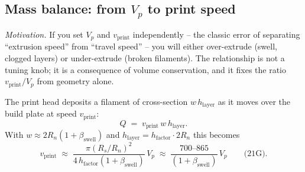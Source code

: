 \documentclass[11pt,a4paper]{article}
\begin{document}
\subsection{Mass balance: from $V_p$ to print speed}
\label{sec:mass_balance_vprint}

\emph{Motivation.}
If you set $V_p$ and $v_\mathrm{print}$ independently -- the classic
error of separating ``extrusion speed'' from ``travel speed'' -- you
will either over-extrude (swell, clogged layers) or under-extrude (broken
filaments). The relationship is not a tuning knob; it is a consequence of
volume conservation, and it fixes the ratio $v_\mathrm{print}/V_p$ from
geometry alone.

The print head deposits a filament of cross-section $w\,h_\mathrm{layer}$
as it moves over the build plate at speed $v_\mathrm{print}$:
\begin{equation}
Q \;=\; v_\mathrm{print}\, w\, h_\mathrm{layer}.
\label{eq:vprint}
\end{equation}
With $w\approx 2R_n(1+\beta_\mathrm{swell})$ and
$h_\mathrm{layer}=h_\mathrm{factor}\cdot 2R_n$ this becomes
\begin{equation}
v_\mathrm{print}
\;\approx\;
\frac{\pi(R_s/R_n)^2}{4\,h_\mathrm{factor}(1+\beta_\mathrm{swell})}\,V_p
\;\approx\; \frac{700\text{--}865}{(1+\beta_\mathrm{swell})}\,V_p
\qquad\text{(21G)}.
\label{eq:vprint_Vp}
\end{equation}
\end{document}
